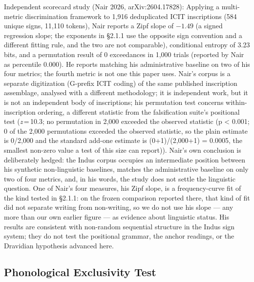 \documentclass[11pt]{article}
\begin{document}
Independent scorecard study (Nair 2026, arXiv:2604.17828): Applying a
multi-metric discrimination framework to 1,916 deduplicated ICIT
inscriptions (584 unique signs, 11,110 tokens), Nair reports a Zipf slope of $-1.49$ (a signed regression slope; the exponents in §2.1.1 use the opposite sign convention and a different fitting rule, and the two are not comparable), conditional entropy of 3.23 bits, and a permutation result of 0 exceedances in 1,000 trials (reported by Nair as percentile 0.000). He reports matching his administrative baseline on two of his four metrics; the fourth metric is not one this paper uses. Nair's corpus is a separate digitization (G-prefix ICIT coding) of the same published inscription assemblage, analysed with a different methodology; it is independent work, but it is not an independent body of inscriptions; his permutation
test concerns within-inscription ordering, a different statistic from
the falsification suite's positional test (\textit{z}\,=\,10.3; no permutation in 2,000 exceeded the observed statistic (p \textless{} 0.001; 0 of the 2,000 permutations exceeded the observed statistic, so the plain estimate is 0/2,000 and the standard add-one estimate is (0+1)/(2,000+1) = 0.0005, the smallest non-zero value a test of this size can report)). Nair's own conclusion is
deliberately hedged: the Indus corpus occupies an intermediate
position between his synthetic non-linguistic baselines, matches the
administrative baseline on only two of four metrics, and, in his
words, the study does not settle the linguistic question. One of Nair's four measures, his Zipf slope, is a frequency-curve fit of the kind tested in §2.1.1: on the frozen comparison reported there, that kind of fit did not separate writing from non-writing, so we do not use his slope --- any more than our own earlier figure --- as evidence about linguistic status. His results are consistent with non-random sequential structure in the Indus sign system; they do not test the positional grammar, the anchor readings, or the Dravidian hypothesis advanced here.

\subsection{Phonological Exclusivity Test
}\label{phonological-exclusivity-test-phase-146}
\end{document}

